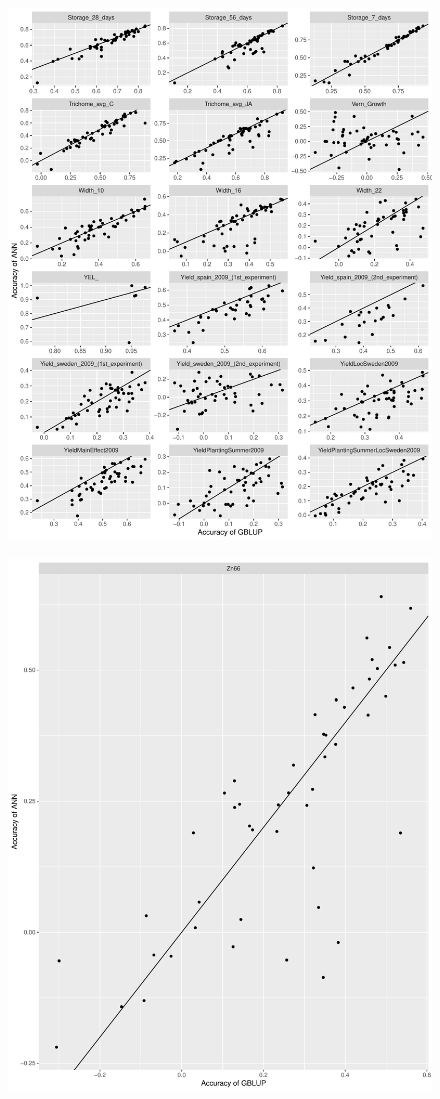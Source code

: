 \begin{figure}[H]
  \centering \includegraphics[height=1.05\textheight, width=1.1\textwidth]{Figures/cor_plots_7}
  \decoRule
 \label{fig:bla}
\end{figure}

\begin{figure}[H]
  \centering \includegraphics[height=.35\textheight, width=.65\textwidth]{Figures/cor_plots_8}
  \decoRule
 \label{fig:bla}
\end{figure}



